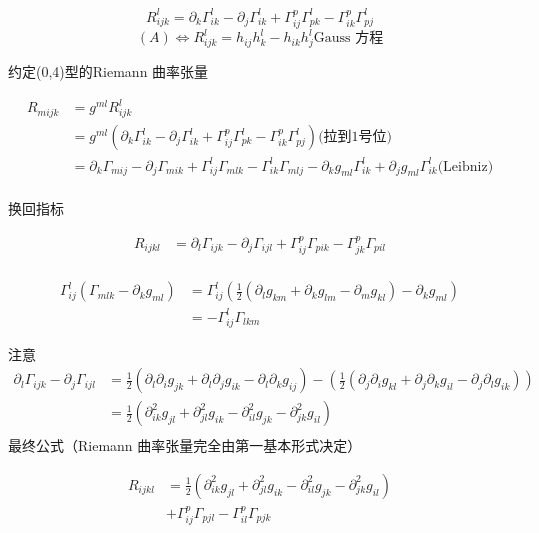 \documentclass[lang=cn,10pt,thmcnt=section]{elegantbook}
\begin{document}
\begin{definition}
    \[
    R_{ijk}^l=\partial_{k} \Gamma_{ik}^l-\partial_{j} \Gamma_{ik}^l+\Gamma_{ij}^p\Gamma_{pk}^l-\Gamma_{ik}^p\Gamma_{pj}^l
    \]
    \[
    (A)\Leftrightarrow R_{ijk}^l=h_{ij}h^l_k-h_{ik}h^l_j\text{Gauss 方程}
    \]
\end{definition}
约定(0,4)型的Riemann 曲率张量

\begin{align*}
    R_{mijk}&=g^{ml}R_{ijk}^l\\
    &=g^{ml}(\partial_{k} \Gamma_{ik}^l-\partial_{j} \Gamma_{ik}^l+\Gamma_{ij}^p\Gamma_{pk}^l-\Gamma_{ik}^p\Gamma_{pj}^l)\text{(拉到1号位)}\\
    &=\partial_k\Gamma_{mij}-\partial_j\Gamma_{mik}+\Gamma_{ij}^l\Gamma_{mlk}-\Gamma_{ik}^l\Gamma_{mlj}-\partial_k g_{ml} \Gamma_{ik}^l+\partial_jg_{ml}\Gamma_{ik}^l\text{(Leibniz)}\\
\end{align*}

换回指标

\begin{align*}
    R_{ijkl}&=\partial_l\Gamma_{ijk}-\partial_j\Gamma_{ijl}+\Gamma_{ij}^p\Gamma_{pik}-\Gamma_{jk}^p\Gamma_{pil}\\
\end{align*}

\begin{align*}
    \Gamma_{ij}^l(\Gamma_{mlk}-\partial_kg_{ml})&=\Gamma_{ij}^l(\frac{1}{2}(\partial_lg_{km}+\partial_kg_{lm}-\partial_mg_{kl})-\partial_kg_{ml})\\
    &= -\Gamma_{ij}^l \Gamma_{lkm}
\end{align*}

注意
\begin{align*}
    \partial_l\Gamma_{ijk}-\partial_j\Gamma_{ijl}&=\frac{1}{2}(\partial_l\partial_ig_{jk}+\partial_l\partial_jg_{ik}-\partial_l\partial_kg_{ij})-(\frac{1}{2}(\partial_j\partial_ig_{kl}+\partial_j\partial_kg_{il}-\partial_j\partial_lg_{ik}))\\
    &=\frac{1}{2}(\partial^2_{ik}g_{jl}+\partial^2_{jl}g_{ik}-\partial^2_{il}g_{jk}-\partial^2_{jk}g_{il})\\
\end{align*}
最终公式（Riemann 曲率张量完全由第一基本形式决定）

\begin{align*}
    R_{ijkl}&=\frac{1}{2}(\partial^2_{ik}g_{jl}+\partial^2_{jl}g_{ik}-\partial^2_{il}g_{jk}-\partial^2_{jk}g_{il})\\
    &+ \Gamma_{ij}^p\Gamma_{pjl}-\Gamma_{il}^p\Gamma_{pjk}
\end{align*}
\end{document}

